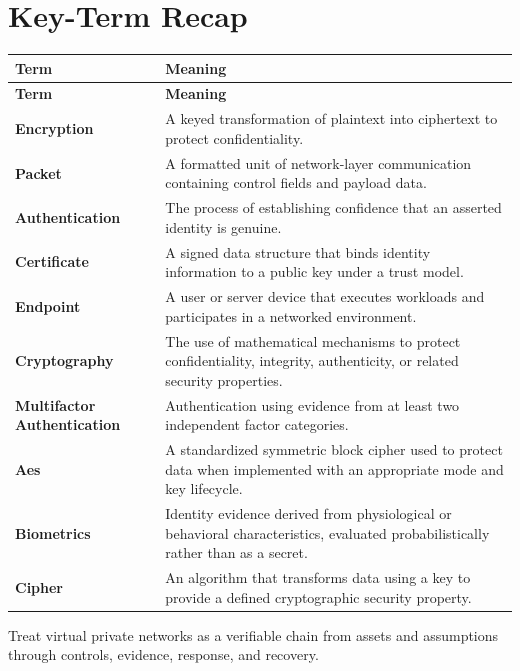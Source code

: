 \documentclass[11pt]{article}
\begin{document}
\section*{Key-Term Recap}
\begin{longtable}{>{\RaggedRight\arraybackslash}p{}>{\RaggedRight\arraybackslash}p{}}
\toprule\rowcolor{Navy}\color{white}\textbf{Term} & \color{white}\textbf{Meaning}\\\midrule
\endfirsthead
\toprule\rowcolor{Navy}\color{white}\textbf{Term} & \color{white}\textbf{Meaning}\\\midrule
\endhead
\textbf{Encryption} & A keyed transformation of plaintext into ciphertext to protect confidentiality. \\\midrule
\textbf{Packet} & A formatted unit of network-layer communication containing control fields and payload data. \\\midrule
\textbf{Authentication} & The process of establishing confidence that an asserted identity is genuine. \\\midrule
\textbf{Certificate} & A signed data structure that binds identity information to a public key under a trust model. \\\midrule
\textbf{Endpoint} & A user or server device that executes workloads and participates in a networked environment. \\\midrule
\textbf{Cryptography} & The use of mathematical mechanisms to protect confidentiality, integrity, authenticity, or related security properties. \\\midrule
\textbf{Multifactor Authentication} & Authentication using evidence from at least two independent factor categories. \\\midrule
\textbf{Aes} & A standardized symmetric block cipher used to protect data when implemented with an appropriate mode and key lifecycle. \\\midrule
\textbf{Biometrics} & Identity evidence derived from physiological or behavioral characteristics, evaluated probabilistically rather than as a secret. \\\midrule
\textbf{Cipher} & An algorithm that transforms data using a key to provide a defined cryptographic security property. \\\midrule
\bottomrule
\end{longtable}
\begin{takeawaybox}
Treat virtual private networks as a verifiable chain from assets and assumptions through controls, evidence, response, and recovery.
\end{takeawaybox}
\end{document}
